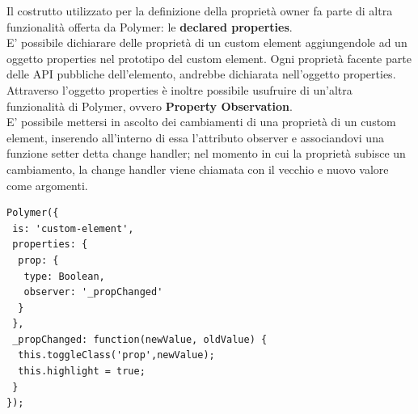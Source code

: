 Il costrutto utilizzato per la definizione della proprietà owner fa parte di altra funzionalità offerta da Polymer: le \textbf{declared properties}.
\\
E’ possibile dichiarare delle proprietà di un custom element aggiungendole ad un oggetto properties nel prototipo del custom element. Ogni proprietà facente parte delle API pubbliche dell’elemento, andrebbe dichiarata nell’oggetto properties. Attraverso l’oggetto properties è inoltre possibile usufruire di un’altra funzionalità di Polymer, ovvero \textbf{Property Observation}.
\\
E’ possibile mettersi in ascolto dei cambiamenti di una proprietà di un custom element, inserendo all’interno di essa l’attributo observer e associandovi una funzione setter detta change handler; nel momento in cui la proprietà subisce un cambiamento, la change handler viene chiamata con il vecchio e nuovo valore come argomenti.
\begin{lstlisting}[language=html]
Polymer({
 is: 'custom-element',
 properties: {
  prop: {
   type: Boolean,
   observer: '_propChanged'
  }
 },
 _propChanged: function(newValue, oldValue) {
  this.toggleClass('prop',newValue);
  this.highlight = true;
 }
});
\end{lstlisting}